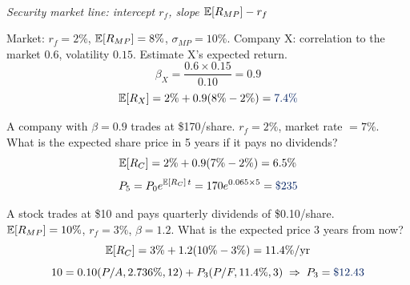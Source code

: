 \begin{center}
    \\[2pt] \textit{\small Security market line: intercept $r_f$, slope $\mathbb{E}[R_{MP}] - r_f$}
\end{center}

\begin{example}
    Market: $r_f = 2\%$, $\mathbb{E}[R_{MP}] = 8\%$, $\sigma_{MP} = 10\%$. Company X:
    correlation to the market $0.6$, volatility $0.15$. Estimate X's
    expected return.
    \[\beta_X = \frac{0.6 \times 0.15}{0.10} = 0.9\]
    \[\E[R_X] = 2\% + 0.9(8\% - 2\%) = \db{7.4\%}\]
\end{example}

\begin{example}
    A company with $\beta = 0.9$ trades at \$170/share. $r_f = 2\%$, market
    rate $= 7\%$. What is the expected share price in 5 years if it pays no
    dividends?
    \[\mathbb{E}[R_C] = 2\% + 0.9(7\% - 2\%) = 6.5\%\]
    \[P_5 = P_0 e^{\E[R_C]\,t} = 170e^{0.065 \times 5} = \db{\$235}\]
\end{example}

\begin{example}
    A stock trades at \$10 and pays quarterly dividends of \$0.10/share.
    $\mathbb{E}[R_{MP}] = 10\%$, $r_f = 3\%$, $\beta = 1.2$. What is the expected
    price 3 years from now?
    \[\mathbb{E}[R_C] = 3\% + 1.2(10\% - 3\%) = 11.4\%/\text{yr}\]
    \[10 = 0.10(P/A,2.736\%,12) + P_3(P/F,11.4\%,3) \;\Rightarrow\; P_3 = \db{\$12.43}\]
\end{example}


